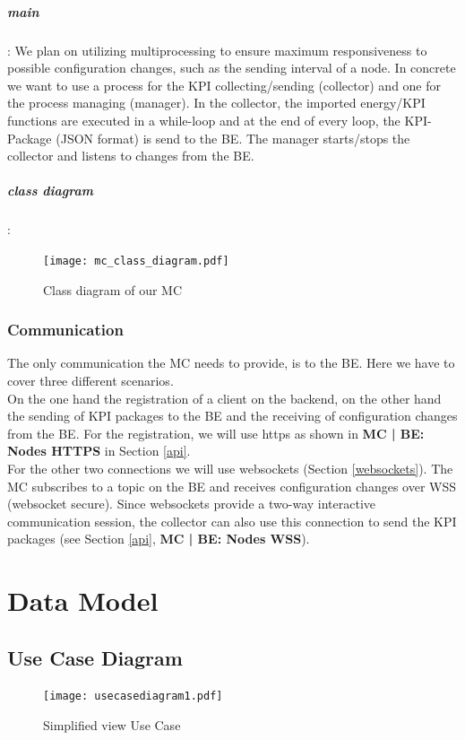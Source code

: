 \documentclass{scrreprt}
\begin{document}
\paragraph{main}: We plan on utilizing multiprocessing to ensure maximum responsiveness to possible configuration changes, such as the sending interval of a node. In concrete we want to use a process for the KPI collecting/sending (collector) and one for the process managing (manager). In the collector, the imported energy/KPI functions are executed in a while-loop and at the end of every loop, the KPI-Package (JSON format) is send to the BE. The manager starts/stops the collector and listens to changes from the BE.

\paragraph{class diagram}:
\begin{figure}[h]
	\centering
	\texttt{[image: mc\_class\_diagram.pdf]}
	\caption{Class diagram of our MC}
	\label{class_mc}
\end{figure}
\subsection{Communication}
The only communication the MC needs to provide, is to the BE.
Here we have to cover three different scenarios. \\
On the one hand the registration of a client on the backend, on the other hand the sending of KPI packages to the BE and the receiving of configuration changes from the BE.
For the registration, we will use https as shown in \textbf{MC | BE: Nodes HTTPS} in Section \ref{api}. \\
For the other two connections we will use websockets (Section \ref{websockets}). The MC subscribes to a topic on the BE and receives configuration changes over WSS (websocket secure). Since websockets provide a two-way interactive communication session, the collector can also use this connection to send the KPI packages (see Section \ref{api}, \textbf{MC | BE: Nodes WSS}).

\chapter{Data Model}
\section{Use Case Diagram}
\begin{figure}[h!]
	\centering
	\texttt{[image: usecasediagram1.pdf]}
	\caption{Simplified view Use Case}
	\label{usecase1}
\end{figure}	
\end{document}
